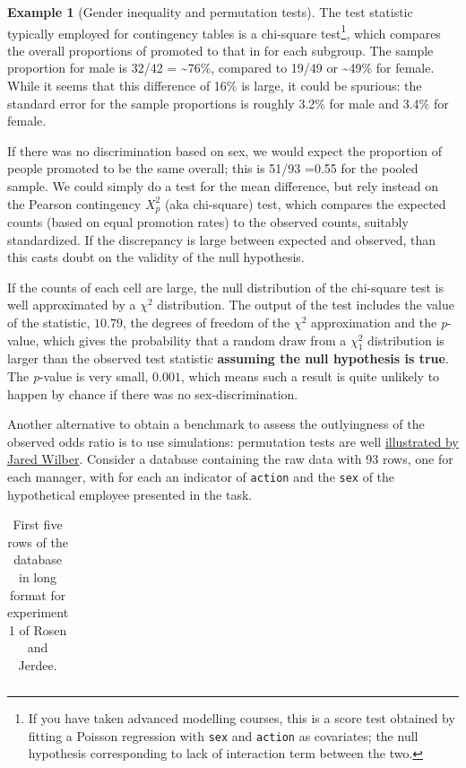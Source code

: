 \documentclass[
  11pt,
  letterpaper,
]{scrbook}
\theoremstyle{definition}
\theoremstyle{definition}
\newtheorem{example}{Example}[chapter]
\theoremstyle{remark}
\begin{document}
\begin{example}[Gender inequality and permutation
tests]
The test statistic typically employed for contingency tables is a
chi-square test\footnote{If you have taken advanced modelling courses,
  this is a score test obtained by fitting a Poisson regression with
  \texttt{sex} and \texttt{action} as covariates; the null hypothesis
  corresponding to lack of interaction term between the two.}, which
compares the overall proportions of promoted to that in for each
subgroup. The sample proportion for male is 32/42 = \textasciitilde76\%,
compared to 19/49 or \textasciitilde49\% for female. While it seems that
this difference of 16\% is large, it could be spurious: the standard
error for the sample proportions is roughly 3.2\% for male and 3.4\% for
female.

If there was no discrimination based on sex, we would expect the
proportion of people promoted to be the same overall; this is 51/93
=0.55 for the pooled sample. We could simply do a test for the mean
difference, but rely instead on the Pearson contingency \(X^2_p\) (aka
chi-square) test, which compares the expected counts (based on equal
promotion rates) to the observed counts, suitably standardized. If the
discrepancy is large between expected and observed, than this casts
doubt on the validity of the null hypothesis.

If the counts of each cell are large, the null distribution of the
chi-square test is well approximated by a \(\chi^2\) distribution. The
output of the test includes the value of the statistic, \(10.79\), the
degrees of freedom of the \(\chi^2\) approximation and the
\emph{p}-value, which gives the probability that a random draw from a
\(\chi^2_1\) distribution is larger than the observed test statistic
\textbf{assuming the null hypothesis is true}. The \emph{p}-value is
very small, \(0.001\), which means such a result is quite unlikely to
happen by chance if there was no sex-discrimination.

Another alternative to obtain a benchmark to assess the outlyingness of
the observed odds ratio is to use simulations: permutation tests are
well \href{https://www.jwilber.me/permutationtest/}{illustrated by Jared
Wilber}. Consider a database containing the raw data with 93 rows, one
for each manager, with for each an indicator of \texttt{action} and the
\texttt{sex} of the hypothetical employee presented in the task.

\begin{longtable}[t]{ll}

\caption{\label{tbl-dat-long-test-rosen-print}First five rows of the
database in long format for experiment 1 of Rosen and Jerdee.}


\end{longtable}
\end{example}
\end{document}
